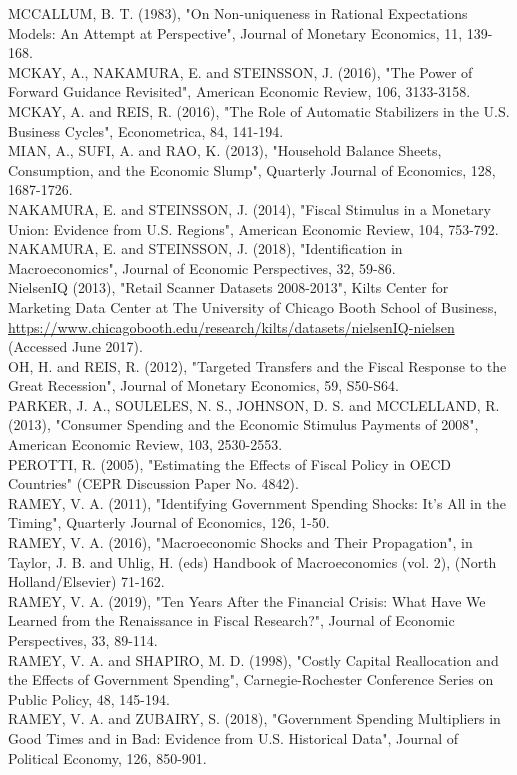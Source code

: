 \documentclass[10pt]{article}
\begin{document}
MCCALLUM, B. T. (1983), "On Non-uniqueness in Rational Expectations Models: An Attempt at Perspective", Journal of Monetary Economics, 11, 139-168.\\
MCKAY, A., NAKAMURA, E. and STEINSSON, J. (2016), "The Power of Forward Guidance Revisited", American Economic Review, 106, 3133-3158.\\
MCKAY, A. and REIS, R. (2016), "The Role of Automatic Stabilizers in the U.S. Business Cycles", Econometrica, 84, 141-194.\\
MIAN, A., SUFI, A. and RAO, K. (2013), "Household Balance Sheets, Consumption, and the Economic Slump", Quarterly Journal of Economics, 128, 1687-1726.\\
NAKAMURA, E. and STEINSSON, J. (2014), "Fiscal Stimulus in a Monetary Union: Evidence from U.S. Regions", American Economic Review, 104, 753-792.\\
NAKAMURA, E. and STEINSSON, J. (2018), "Identification in Macroeconomics", Journal of Economic Perspectives, 32, 59-86.\\
NielsenIQ (2013), "Retail Scanner Datasets 2008-2013", Kilts Center for Marketing Data Center at The University of Chicago Booth School of Business, \href{https://www.chicagobooth.edu/research/kilts/datasets/nielsenIQ-nielsen}{https://www.chicagobooth.edu/research/kilts/datasets/nielsenIQ-nielsen} (Accessed June 2017).\\
OH, H. and REIS, R. (2012), "Targeted Transfers and the Fiscal Response to the Great Recession", Journal of Monetary Economics, 59, S50-S64.\\
PARKER, J. A., SOULELES, N. S., JOHNSON, D. S. and MCCLELLAND, R. (2013), "Consumer Spending and the Economic Stimulus Payments of 2008", American Economic Review, 103, 2530-2553.\\
PEROTTI, R. (2005), "Estimating the Effects of Fiscal Policy in OECD Countries" (CEPR Discussion Paper No. 4842).\\
RAMEY, V. A. (2011), "Identifying Government Spending Shocks: It's All in the Timing", Quarterly Journal of Economics, 126, 1-50.\\
RAMEY, V. A. (2016), "Macroeconomic Shocks and Their Propagation", in Taylor, J. B. and Uhlig, H. (eds) Handbook of Macroeconomics (vol. 2), (North Holland/Elsevier) 71-162.\\
RAMEY, V. A. (2019), "Ten Years After the Financial Crisis: What Have We Learned from the Renaissance in Fiscal Research?", Journal of Economic Perspectives, 33, 89-114.\\
RAMEY, V. A. and SHAPIRO, M. D. (1998), "Costly Capital Reallocation and the Effects of Government Spending", Carnegie-Rochester Conference Series on Public Policy, 48, 145-194.\\
RAMEY, V. A. and ZUBAIRY, S. (2018), "Government Spending Multipliers in Good Times and in Bad: Evidence from U.S. Historical Data", Journal of Political Economy, 126, 850-901.
\end{document}
